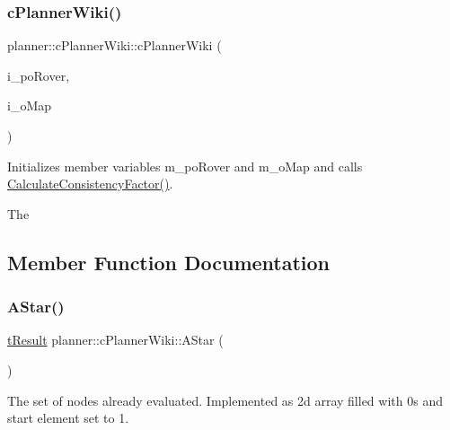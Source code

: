 \subsubsection{\texorpdfstring{c\+Planner\+Wiki()}{cPlannerWiki()}\hspace{0.1cm}{\footnotesize\ttfamily [2/2]}}
{\footnotesize\ttfamily planner\+::c\+Planner\+Wiki\+::c\+Planner\+Wiki (\begin{DoxyParamCaption}\item[{std\+::shared\+\_\+ptr$<$ \mbox{\hyperlink{classplanner_1_1c_rover_interface}{c\+Rover\+Interface}}$<$ 8 $>$$>$}]{i\+\_\+po\+Rover,  }\item[{std\+::shared\+\_\+ptr$<$ \mbox{\hyperlink{classplanner_1_1c_graph}{c\+Graph}} $>$}]{i\+\_\+o\+Map }\end{DoxyParamCaption})}



Initializes member variables m\+\_\+po\+Rover and m\+\_\+o\+Map and calls \mbox{\hyperlink{classplanner_1_1c_planner_a2e5a745f83f903662eff914d8beddb5e}{Calculate\+Consistency\+Factor()}}. 

The 

\subsection{Member Function Documentation}
\mbox{\label{classplanner_1_1c_planner_wiki_aa673ebc2b1b43af3b13fb0c958c5f2e4}} 
\subsubsection{\texorpdfstring{A\+Star()}{AStar()}}
{\footnotesize\ttfamily \mbox{\hyperlink{structt_result}{t\+Result}} planner\+::c\+Planner\+Wiki\+::\+A\+Star (\begin{DoxyParamCaption}{ }\end{DoxyParamCaption})\hspace{0.3cm}{\ttfamily [protected]}}

The set of nodes already evaluated. Implemented as 2d array filled with 0s and start element set to 1.

